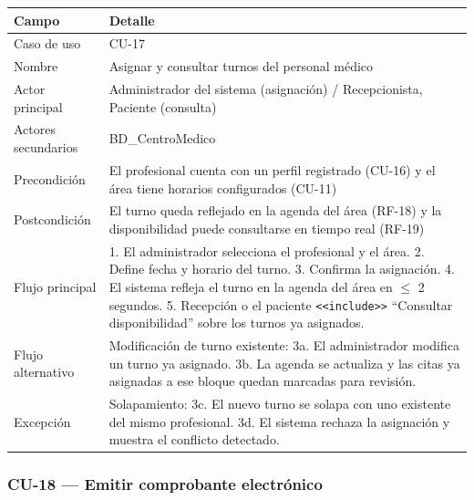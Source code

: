 \documentclass[11pt,a4paper]{article}
\begin{document}
	\begin{longtable}{p{} p{} }
		
		
		\toprule
		\textbf{Campo} &
		\textbf{Detalle}  \\
		\midrule
		\endhead
		
		Caso de uso & CU-17 \\
		Nombre & Asignar y consultar turnos del personal médico \\
		Actor principal & Administrador del sistema (asignación) / Recepcionista, Paciente (consulta) \\
		Actores secundarios & BD\_CentroMedico \\
		Precondición & El profesional cuenta con un perfil registrado (CU-16) y el área tiene horarios configurados (CU-11) \\
		Postcondición & El turno queda reflejado en la agenda del área (RF-18) y la disponibilidad puede consultarse en tiempo real (RF-19) \\
		Flujo principal & 1. El administrador selecciona el profesional y el área. 2. Define fecha y horario del turno. 3. Confirma la asignación. 4. El sistema refleja el turno en la agenda del área en \(\leq\) 2 segundos. 5. Recepción o el paciente \texttt{<<include>>} ``Consultar disponibilidad'' sobre los turnos ya asignados. \\
		Flujo alternativo & Modificación de turno existente: 3a. El administrador modifica un turno ya asignado. 3b. La agenda se actualiza y las citas ya asignadas a ese bloque quedan marcadas para revisión. \\
		Excepción & Solapamiento: 3c. El nuevo turno se solapa con uno existente del mismo profesional. 3d. El sistema rechaza la asignación y muestra el conflicto detectado. \\
		\bottomrule
	\end{longtable}
	
	\subsubsection{CU-18 --- Emitir comprobante electrónico}
	
\end{document}
